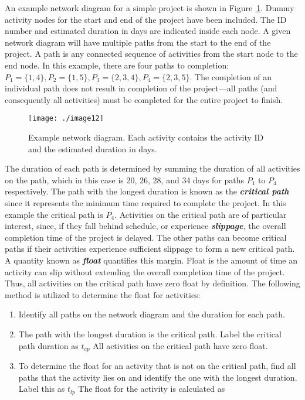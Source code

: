 An example network diagram for a simple project is shown in 
Figure~\ref{figure:exampleNetworkDiagram}.
Dummy activity nodes for the start and end of the project have been
included. The ID number and estimated duration in days are indicated
inside each node. A given network diagram will have multiple paths from
the start to the end of the project. A path is any connected sequence of
activities from the start node to the end node. In this example, there
are four paths to completion:
$P_1 = \{1,4\} , P_2 = \{1,5\}, P_3 = \{2,3,4\}, P_4 = \{2,3,5\}$.
The completion of an individual path does not result in completion of
the project---all paths (and consequently all activities) must be
completed for the entire project to finish.

\begin{figure}[h]
\centering
\texttt{[image: ./image12]}
\caption{Example network diagram. Each activity contains the
activity ID and the estimated duration in days.}
\label{figure:exampleNetworkDiagram}
\end{figure}

The duration of each path is determined by summing the duration of all
activities on the path, which in this case is 20, 26, 28, and 34 days
for paths $P_1$ to $P_4$
respectively. The path with the longest duration is known as the
\emph{\textbf{critical path}} since it represents the minimum time
required to complete the project. In this example the critical path is
$P_4$.
Activities on the critical path are of particular interest, since, if
they fall behind schedule, or experience \emph{\textbf{slippage}}, the
overall completion time of the project is delayed. The other paths can
become critical paths if their activities experience sufficient slippage
to form a new critical path. A quantity known as \emph{\textbf{float}}
quantifies this margin. Float is the amount of time an activity can slip
without extending the overall completion time of the project. Thus, all
activities on the critical path have zero float by definition. The
following method is utilized to determine the float for activities:

\begin{enumerate}
\def\labelenumi{\arabic{enumi}.}
\item
  Identify all paths on the network diagram and the duration for each
  path.
\item
  The path with the longest duration is the critical path. Label the
  critical path duration as $t_{cp}$
  All activities on the critical path have zero float.
\item
  To determine the float for an activity that is not on the critical
  path, find all paths that the activity lies on and identify the one
  with the longest duration. Label this as $t_{lp}$ The float for the
  activity is calculated as
\end{enumerate}


